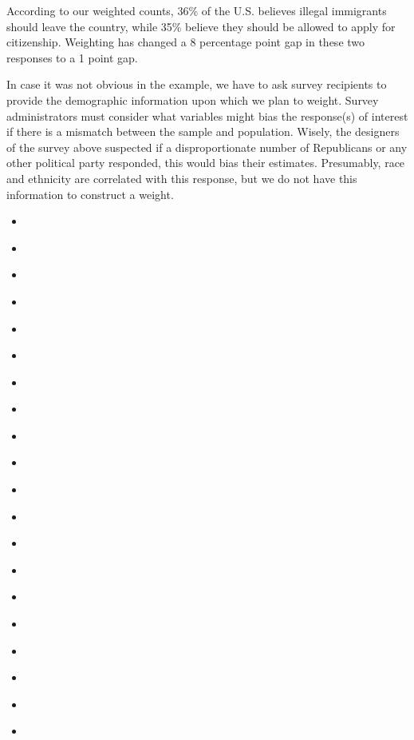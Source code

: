 \documentclass[
]{book}
\providecommand{\tightlist}{%
  \setlength{\itemsep}{0pt}\setlength{\parskip}{0pt}}
\begin{document}
According to our weighted counts, 36\% of the U.S. believes illegal immigrants should leave the country, while 35\% believe they should be allowed to apply for citizenship. Weighting has changed a 8 percentage point gap in these two responses to a 1 point gap.

In case it was not obvious in the example, we have to ask survey recipients to provide the demographic information upon which we plan to weight. Survey administrators must consider what variables might bias the response(s) of interest if there is a mismatch between the sample and population. Wisely, the designers of the survey above suspected if a disproportionate number of Republicans or any other political party responded, this would bias their estimates. Presumably, race and ethnicity are correlated with this response, but we do not have this information to construct a weight.

\begin{itemize}
\tightlist
\item
  \citet{R-arsenal}
\item
  \citet{R-base}
\item
  \citet{R-broom}
\item
  \citet{R-car}
\item
  \citet{R-carData}
\item
  \citet{R-DAAG}
\item
  \citet{R-data.table}
\item
  \citet{R-dplyr}
\item
  \citet{R-Ecdat}
\item
  \citet{R-fivethirtyeight}
\item
  \citet{R-forecast}
\item
  \citet{R-fpp2}
\item
  \citet{R-gapminder}
\item
  \citet{R-gvlma}
\item
  \citet{R-knitr}
\item
  \citet{R-moderndive}
\item
  \citet{R-openintro}
\item
  \citet{R-plm}
\item
  \citet{R-Stat2Data}
\item
  \citet{R-tidyverse}
\end{itemize}

  

\backmatter
\printindex
\end{document}
